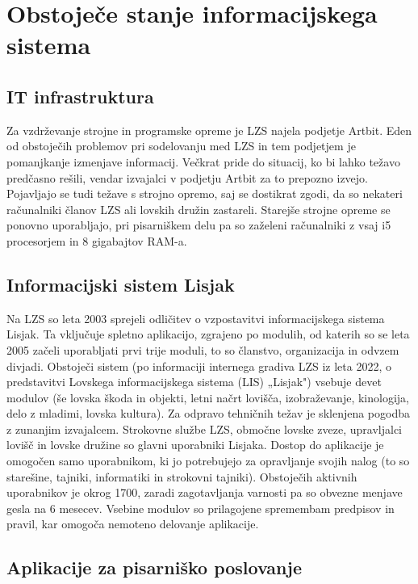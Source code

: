 \documentclass[a4paper,12pt,openright]{book}
\begin{document}
\chapter{Obstoječe stanje informacijskega sistema}
\label{stanje}

\section{IT infrastruktura}

Za vzdrževanje strojne in programske opreme je LZS najela podjetje Artbit.
Eden od obstoječih problemov pri sodelovanju med LZS in tem podjetjem je pomanjkanje izmenjave informacij. 
Večkrat pride do situacij, ko bi lahko težavo predčasno rešili, vendar izvajalci v podjetju Artbit za to prepozno izvejo.
Pojavljajo se tudi težave s strojno opremo, saj se dostikrat zgodi, da so nekateri računalniki članov LZS ali lovskih družin zastareli.
Starejše strojne opreme se ponovno uporabljajo, pri pisarniškem delu pa so zaželeni računalniki z vsaj i5 procesorjem in 8 gigabajtov RAM-a.


\section{Informacijski sistem Lisjak}

Na LZS so leta 2003 sprejeli odličitev o vzpostavitvi informacijskega sistema Lisjak. 
Ta vključuje spletno aplikacijo, zgrajeno po modulih, od katerih so se leta 2005 začeli uporabljati prvi trije moduli, to so članstvo, organizacija in odvzem divjadi.
Obstoječi sistem (po informaciji internega gradiva LZS iz leta 2022, o predstavitvi Lovskega informacijskega sistema (LIS) „Lisjak") vsebuje devet modulov (še lovska škoda in objekti, letni načrt lovišča, izobraževanje, kinologija, delo z mladimi, lovska kultura).
Za odpravo tehničnih težav je sklenjena pogodba z zunanjim izvajalcem.
Strokovne službe LZS, območne lovske zveze, upravljalci lovišč in lovske družine so glavni uporabniki Lisjaka.
Dostop do aplikacije je omogočen samo uporabnikom, ki jo potrebujejo za opravljanje svojih nalog (to so starešine, tajniki, informatiki in strokovni tajniki).
Obstoječih aktivnih uporabnikov je okrog 1700, zaradi zagotavljanja varnosti pa so obvezne menjave gesla na 6 mesecev.
Vsebine modulov so prilagojene spremembam predpisov in pravil, kar omogoča nemoteno delovanje aplikacije.


\section{Aplikacije za pisarniško poslovanje}
\end{document}
